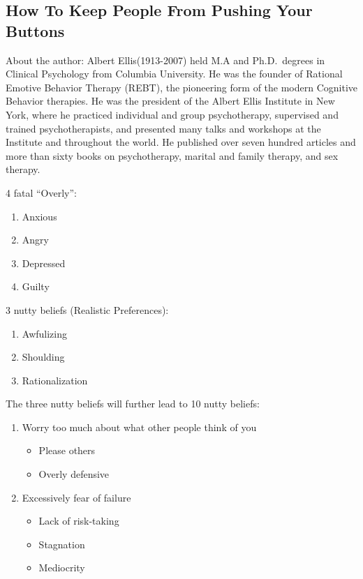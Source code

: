 \documentclass[12pt,]{krantz}
\providecommand{\tightlist}{%
  \setlength{\itemsep}{0pt}\setlength{\parskip}{0pt}}
\renewenvironment{quote}{\begin{VF}}{\end{VF}}
\begin{document}
\subsection{How To Keep People From Pushing Your
Buttons}\label{how-to-keep-people-from-pushing-your-buttons}

\begin{quote}
About the author: Albert Ellis(1913-2007) held M.A and Ph.D.~degrees in
Clinical Psychology from Columbia University. He was the founder of
Rational Emotive Behavior Therapy (REBT), the pioneering form of the
modern Cognitive Behavior therapies. He was the president of the Albert
Ellis Institute in New York, where he practiced individual and group
psychotherapy, supervised and trained psychotherapists, and presented
many talks and workshops at the Institute and throughout the world. He
published over seven hundred articles and more than sixty books on
psychotherapy, marital and family therapy, and sex therapy.
\end{quote}

4 fatal ``Overly'':

\begin{enumerate}
\def\labelenumi{\arabic{enumi}.}
\tightlist
\item
  Anxious
\item
  Angry
\item
  Depressed
\item
  Guilty
\end{enumerate}

3 nutty beliefs (Realistic Preferences):

\begin{enumerate}
\def\labelenumi{(\arabic{enumi})}
\tightlist
\item
  Awfulizing
\item
  Shoulding
\item
  Rationalization
\end{enumerate}

The three nutty beliefs will further lead to 10 nutty beliefs:

\begin{enumerate}
\def\labelenumi{(\arabic{enumi})}
\tightlist
\item
  Worry too much about what other people think of you

  \begin{itemize}
  \tightlist
  \item
    Please others
  \item
    Overly defensive
  \end{itemize}
\item
  Excessively fear of failure

  \begin{itemize}
  \tightlist
  \item
    Lack of risk-taking
  \item
    Stagnation
  \item
    Mediocrity
  \end{itemize}
\end{enumerate}
\end{document}
